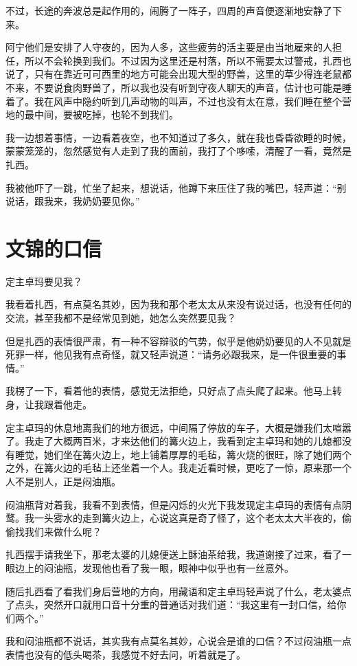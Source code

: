 不过，长途的奔波总是起作用的，闹腾了一阵子，四周的声音便逐渐地安静了下来。

阿宁他们是安排了人守夜的，因为人多，这些疲劳的活主要是由当地雇来的人担任，所以不会轮换到我们。不过因为这里还是村落，所以不需要太过警戒，扎西也说了，只有在靠近可可西里的地方可能会出现大型的野兽，这里的草少得连老鼠都不来，不要说食肉野兽了，所以我也没有听到守夜人聊天的声音，估计也可能是睡着了。我在风声中隐约听到几声动物的叫声，不过也没有太在意，我们睡在整个营地的最中间，要被吃掉，也轮不到我们。

我一边想着事情，一边看着夜空，也不知道过了多久，就在我也昏昏欲睡的时候，蒙蒙笼笼的，忽然感觉有人走到了我的面前，我打了个哆嗦，清醒了一看，竟然是扎西。

我被他吓了一跳，忙坐了起来，想说话，他蹲下来压住了我的嘴巴，轻声道：“别说话，跟我来，我奶奶要见你。”

\chapter{文锦的口信}

定主卓玛要见我？

我看着扎西，有点莫名其妙，因为我和那个老太太从来没有说过话，也没有任何的交流，甚至我都不是经常见到她，她怎么突然要见我？

但是扎西的表情很严肃，有一种不容辩驳的气势，似乎是他奶奶要见的人不见就是死罪一样，他见我有点奇怪，就又轻声说道：“请务必跟我来，是一件很重要的事情。”

我楞了一下，看着他的表情，感觉无法拒绝，只好点了点头爬了起来。他马上转身，让我跟着他走。

定主卓玛的休息地离我们的地方很远，中间隔了停放的车子，大概是嫌我们太喧嚣了。我走了大概两百米，才来达他们的篝火边上，我看到定主卓玛和她的儿媳都没有睡觉，她们坐在篝火边上，地上铺着厚厚的毛毡，篝火烧的很旺，除了她们两个之外，在篝火边的毛毡上还坐着一个人。我走近看时候，更吃了一惊，原来那一个人不是别人，正是闷油瓶。

闷油瓶背对着我，我看不到表情，但是闪烁的火光下我发现定主卓玛的表情有点阴鹜。我一头雾水的走到篝火边上，心说这真是奇了怪了，这个老太太大半夜的，偷偷找我们来做什么呢？

扎西摆手请我坐下，那老太婆的儿媳便送上酥油茶给我，我道谢接了过来，看了一眼边上的闷油瓶，发现他也看了我一眼，眼神中似乎也有一丝意外。

随后扎西看了看我们身后营地的方向，用藏语和定主卓玛轻声说了什么，老太婆点了点头，突然开口就用口音十分重的普通话对我们道：“我这里有一封口信，给你们两个。”

我和闷油瓶都不说话，其实我有点莫名其妙，心说会是谁的口信？不过闷油瓶一点表情也没有的低头喝茶，我感觉不好去问，听着就是了。

